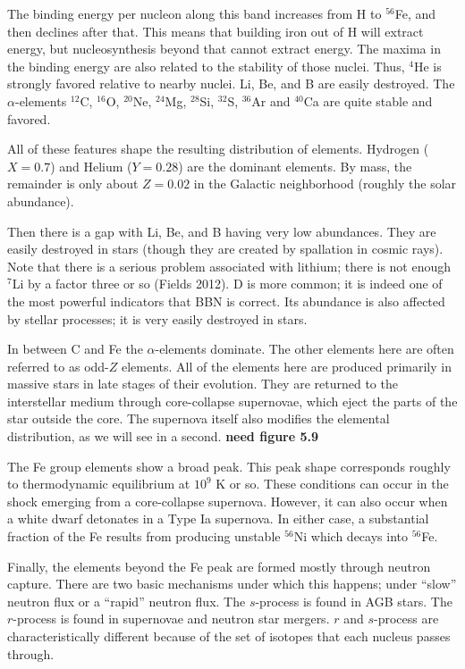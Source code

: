 The binding energy per nucleon along this band increases from H to
$^{56}$Fe, and then declines after that.  This means that building
iron out of H will extract energy, but nucleosynthesis beyond that
cannot extract energy. The maxima in the binding energy are also
related to the stability of those nuclei. Thus, $^4$He is strongly
favored relative to nearby nuclei. Li, Be, and B are easily
destroyed. The $\alpha$-elements $^{12}$C, $^{16}$O, $^{20}$Ne,
$^{24}$Mg, $^{28}$Si, $^{32}$S, $^{36}$Ar and $^{40}$Ca are quite
stable and favored.

All of these features shape the resulting distribution of elements.
Hydrogen ($X=0.7$) and Helium ($Y=0.28$) are the dominant elements. By
mass, the remainder is only about $Z=0.02$ in the Galactic
neighborhood (roughly the solar abundance).

Then there is a gap with Li, Be, and B having very low
abundances. They are easily destroyed in stars (though they are
created by spallation in cosmic rays). Note that there is a serious
problem associated with lithium; there is not enough $^7$Li by a
factor three or so (Fields 2012). D is more common; it is indeed one
of the most powerful indicators that BBN is correct. Its abundance is
also affected by stellar processes; it is very easily destroyed in
stars.

In between C and Fe the $\alpha$-elements dominate. The other elements
here are often referred to as odd-$Z$ elements. All of the elements
here are produced primarily in massive stars in late stages of their
evolution. They are returned to the interstellar medium through
core-collapse supernovae, which eject the parts of the star outside
the core.  The supernova itself also modifies the elemental
distribution, as we will see in a second. {\bf need figure 5.9}

The Fe group elements show a broad peak. This peak shape corresponds
roughly to thermodynamic equilibrium at $10^9$ K or so. These
conditions can occur in the shock emerging from a core-collapse
supernova. However, it can also occur when a white dwarf detonates in
a Type Ia supernova. In either case, a substantial fraction of the Fe
results from producing unstable $^{56}$Ni which decays into $^{56}$Fe.

Finally, the elements beyond the Fe peak are formed mostly through
neutron capture. There are two basic mechanisms under which this
happens; under ``slow'' neutron flux or a ``rapid'' neutron flux.  The
$s$-process is found in AGB stars. The $r$-process is found in
supernovae and neutron star mergers. $r$ and $s$-process are
characteristically different because of the set of isotopes that each
nucleus passes through.

